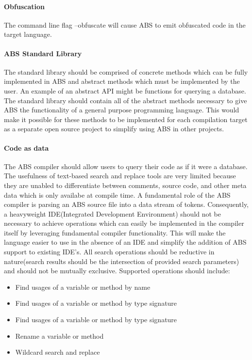 \documentclass[hidelinks]{article}
\begin{document}
\paragraph{Obfuscation} The command line flag --obfuscate will cause ABS to emit obfuscated code in the target language.
\paragraph{ABS Standard Library} The standard library should be comprised of concrete methods which can be fully implemented in ABS and abstract methods which must be implemented by the user. An example of an abstract API might be functions for querying a database. The standard library should contain all of the abstract methods necessary to give ABS the functionality of a general purpose programming language. This would make it possible for these methods to be implemented for each compilation target as a separate open source project to simplify using ABS in other projects.\paragraph{Code as data}
The ABS compiler should allow users to query their code as if it were a database. The usefulness of text-based search and replace tools are very limited because they are unabled to differentiate between comments, source code, and other meta data which is only availabe at compile time. A fundamental role of the ABS compiler is parsing an ABS source file into a data stream of tokens. Consequently, a heavyweight IDE(Integrated Development Environment) should not be necessary to achieve operations which can easily be implemented in the compiler itself by leveraging fundamental compiler functionality. This will make the language easier to use in the absence of an IDE and simplify the addition of ABS support to existing IDE's. All search operations should be reductive in nature(search results should be the intersection of provided search parameters) and should not be mutually exclusive. Supported operations should include:
\begin{itemize}
	\item Find usages of a variable or method by name
	\item Find usages of a variable or method by type signature
	\item Find usages of a variable or method by type signature
	\item Rename a variable or method
	\item Wildcard search and replace
\end{itemize}
\end{document}
